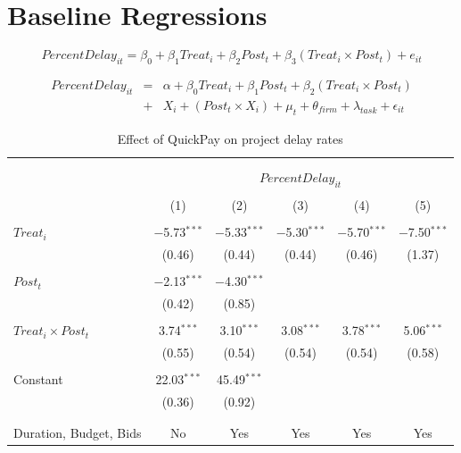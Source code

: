 \documentclass[
]{article}
\begin{document}
\hypertarget{baseline-regressions}{%
\section{Baseline Regressions}\label{baseline-regressions}}

\[ PercentDelay_{it} = \beta_0 + \beta_1 Treat_i + \beta_2 Post_t + \beta_3 (Treat_i \times Post_t) + e_{it}\]

\[ \begin{aligned} PercentDelay_{it} &=& \alpha+\beta_0 Treat_i + \beta_1 Post_t + \beta_2 (Treat_i \times Post_t)\\
&+&  X_i + (Post_t \times X_i) + \mu_t + \theta_{firm} + \lambda_{task}+ \epsilon_{it}
\end{aligned}\]

\begin{table}[H] \centering 
  \caption{Effect of QuickPay on project delay rates} 
  \label{} 
\small 
\begin{tabular}{@{\extracolsep{-2pt}}lccccc} 
\\[-1.8ex]\hline 
\hline \\[-1.8ex] 
\\[-1.8ex] & \multicolumn{5}{c}{$PercentDelay_{it}$} \\ 
\\[-1.8ex] & (1) & (2) & (3) & (4) & (5)\\ 
\hline \\[-1.8ex] 
 $Treat_i$ & $-$5.73$^{***}$ & $-$5.33$^{***}$ & $-$5.30$^{***}$ & $-$5.70$^{***}$ & $-$7.50$^{***}$ \\ 
  & (0.46) & (0.44) & (0.44) & (0.46) & (1.37) \\ 
  & & & & & \\ 
 $Post_t$ & $-$2.13$^{***}$ & $-$4.30$^{***}$ &  &  &  \\ 
  & (0.42) & (0.85) &  &  &  \\ 
  & & & & & \\ 
 $Treat_i \times Post_t$ & 3.74$^{***}$ & 3.10$^{***}$ & 3.08$^{***}$ & 3.78$^{***}$ & 5.06$^{***}$ \\ 
  & (0.55) & (0.54) & (0.54) & (0.54) & (0.58) \\ 
  & & & & & \\ 
 Constant & 22.03$^{***}$ & 45.49$^{***}$ &  &  &  \\ 
  & (0.36) & (0.92) &  &  &  \\ 
  & & & & & \\ 
\hline \\[-1.8ex] 
Duration, Budget, Bids & No & Yes & Yes & Yes & Yes \\ 

\end{tabular}
\end{table}
\end{document}
